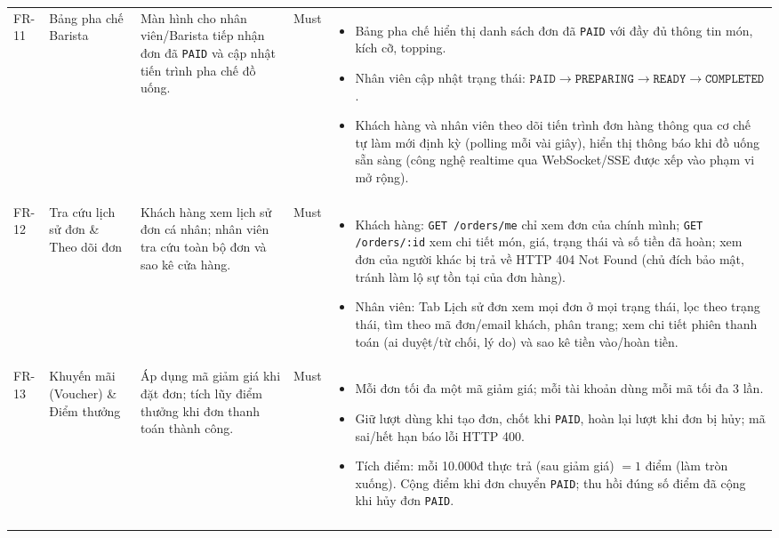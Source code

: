 \begin{longtable}{@{}p{1.2cm}p{2.6cm}p{4.2cm}p{1.4cm}p{6.6cm}@{}}
FR-11 & Bảng pha chế Barista
  & Màn hình cho nhân viên/Barista tiếp nhận đơn đã \texttt{PAID} và cập nhật tiến trình pha chế đồ uống.
  & Must
  & \begin{itemize}[leftmargin=*]
      \item Bảng pha chế hiển thị danh sách đơn đã \texttt{PAID} với đầy đủ thông tin món, kích cỡ, topping.
      \item Nhân viên cập nhật trạng thái: $\texttt{PAID} \rightarrow \texttt{PREPARING} \rightarrow \texttt{READY} \rightarrow \texttt{COMPLETED}$.
      \item Khách hàng và nhân viên theo dõi tiến trình đơn hàng thông qua cơ chế tự làm mới định kỳ (polling mỗi vài giây), hiển thị thông báo khi đồ uống sẵn sàng (công nghệ realtime qua WebSocket/SSE được xếp vào phạm vi mở rộng).
    \end{itemize} \\
\addlinespace

FR-12 & Tra cứu lịch sử đơn \& Theo dõi đơn
  & Khách hàng xem lịch sử đơn cá nhân; nhân viên tra cứu toàn bộ đơn và sao kê cửa hàng.
  & Must
  & \begin{itemize}[leftmargin=*]
      \item Khách hàng: \texttt{GET /orders/me} chỉ xem đơn của chính mình; \texttt{GET /orders/:id} xem chi tiết món, giá, trạng thái và số tiền đã hoàn; xem đơn của người khác bị trả về HTTP 404 Not Found (chủ đích bảo mật, tránh làm lộ sự tồn tại của đơn hàng).
      \item Nhân viên: Tab Lịch sử đơn xem mọi đơn ở mọi trạng thái, lọc theo trạng thái, tìm theo mã đơn/email khách, phân trang; xem chi tiết phiên thanh toán (ai duyệt/từ chối, lý do) và sao kê tiền vào/hoàn tiền.
    \end{itemize} \\
\addlinespace

FR-13 & Khuyến mãi (Voucher) \& Điểm thưởng
  & Áp dụng mã giảm giá khi đặt đơn; tích lũy điểm thưởng khi đơn thanh toán thành công.
  & Must
  & \begin{itemize}[leftmargin=*]
      \item Mỗi đơn tối đa một mã giảm giá; mỗi tài khoản dùng mỗi mã tối đa 3 lần.
      \item Giữ lượt dùng khi tạo đơn, chốt khi \texttt{PAID}, hoàn lại lượt khi đơn bị hủy; mã sai/hết hạn báo lỗi HTTP 400.
      \item Tích điểm: mỗi 10.000đ thực trả (sau giảm giá) $= 1$ điểm (làm tròn xuống). Cộng điểm khi đơn chuyển \texttt{PAID}; thu hồi đúng số điểm đã cộng khi hủy đơn \texttt{PAID}.
    \end{itemize} \\
\addlinespace


\end{longtable}
